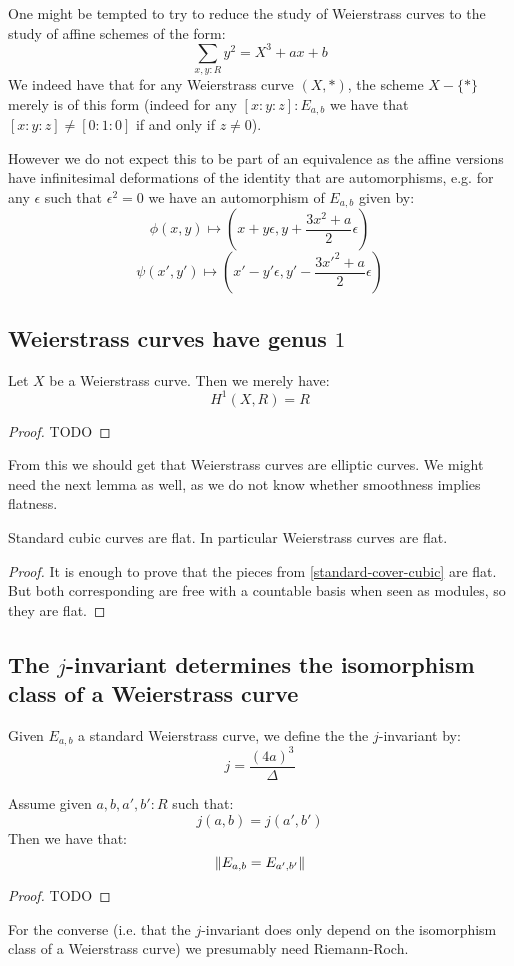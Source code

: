 One might be tempted to try to reduce the study of Weierstrass curves to the study of affine schemes of the form:
\[ \sum_{x,y:R} y^2 = X^3 + ax + b\]
We indeed have that for any Weierstrass curve $(X,*)$, the scheme $X - \{*\}$ merely is of this form (indeed for any $[x:y:z] : E_{a,b}$ we have that $[x:y:z]\not=[0:1:0]$ if and only if $z\not=0$). 

However we do not expect this to be part of an equivalence as the affine versions have infinitesimal deformations of the identity that are automorphisms, e.g. for any $\epsilon$ such that $\epsilon^2=0$ we have an automorphism of $E_{a,b}$ given by:
\[\phi(x,y) \mapsto (x+y\epsilon , y+ \frac{3x^2 + a}{2} \epsilon)\]
\[\psi(x',y') \mapsto (x'-y'\epsilon , y'- \frac{3{x'}^2 + a}{2} \epsilon)\]

\subsection{Weierstrass curves have genus $1$}

\begin{lemma}
Let $X$ be a Weierstrass curve. Then we merely have:
\[H^1(X,R) = R\]
\end{lemma}

\begin{proof}
TODO
\end{proof}

From this we should get that Weierstrass curves are elliptic curves. We might need the next lemma as well, as we do not know whether smoothness implies flatness.

\begin{lemma}
Standard cubic curves are flat. In particular Weierstrass curves are flat.
\end{lemma}

\begin{proof}
It is enough to prove that the pieces from \cref{standard-cover-cubic} are flat. But both corresponding are free with a countable basis when seen as modules, so they are flat.
\end{proof}

\subsection{The $j$-invariant determines the isomorphism class of a Weierstrass curve}

\begin{definition}
Given $E_{a,b}$ a standard Weierstrass curve, we define the the $j$-invariant by:
\[j  = \frac{(4a)^3}{\Delta}\] 
\end{definition}

\begin{lemma}
Assume given $a,b,a',b':R$ such that:
\[j(a,b) = j(a',b')\]
Then we have that:
\[\lVert E_{a,b} = E_{a',b'} \rVert\]
\end{lemma}

\begin{proof}
TODO
\end{proof}

For the converse (i.e. that the $j$-invariant does only depend on the isomorphism class of a Weierstrass curve) we presumably need Riemann-Roch.